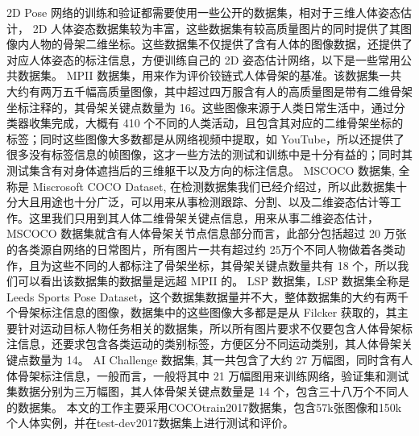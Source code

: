 2D Pose 网络的训练和验证都需要使用一些公开的数据集，相对于三维人体姿态估计， 2D 人体姿态数据集较为丰富，这些数据集有较高质量图片的同时提供了其图像内人物的骨架二维坐标。这些数据集不仅提供了含有人体的图像数据，还提供了对应人体姿态的标注信息，方便训练自己的 2D 姿态估计网络，以下是一些常用公共数据集。
MPII 数据集，用来作为评价铰链式人体骨架的基准。该数据集一共大约有两万五千幅高质量图像，其中超过四万服含有人的高质量图是带有二维骨架坐标注释的，其骨架关键点数量为 16。这些图像来源于人类日常生活中，通过分类器收集完成，大概有 410 个不同的人类活动，且包含其对应的二维骨架坐标的标签；同时这些图像大多数都是从网络视频中提取，如 YouTube，所以还提供了很多没有标签信息的帧图像，这才一些方法的测试和训练中是十分有益的；同时其测试集含有对身体遮挡后的三维躯干以及方向的标注信息。
MSCOCO 数据集, 全称是 Miscrosoft COCO Dataset, 在检测数据集我们已经介绍过，所以此数据集十分大且用途也十分广泛，可以用来从事检测跟踪、分割、以及二维姿态估计等工作。这里我们只用到其人体二维骨架关键点信息，用来从事二维姿态估计，MSCOCO 数据集就含有人体骨架关节点信息部分而言，此部分包括超过 20 万张的各类源自网络的日常图片，所有图片一共有超过约 25万个不同人物做着各类动作，且为这些不同的人都标注了骨架坐标，其骨架关键点数量共有 18 个，所以我们可以看出该数据集的数据量是远超 MPII 的。
LSP 数据集，LSP 数据集全称是 Leeds Sports Pose Dataset，这个数据集数据量并不大，整体数据集的大约有两千个骨架标注信息的图像，数据集中的这些图像大多都是是从 Filcker 获取的，其主要针对运动目标人物任务相关的数据集，所以所有图片要求不仅要包含人体骨架标注信息，还要求包含各类运动的类别标签，方便区分不同运动类别，其人体骨架关键点数量为 14。
AI Challenge 数据集, 其一共包含了大约 27 万幅图，同时含有人体骨架标注信息，一般而言，一般将其中 21 万幅图用来训练网络，验证集和测试集数据分别为三万幅图，其人体骨架关键点数量是 14 个，包含三十八万个不同人的数据集。
本文的工作主要采用COCOtrain2017数据集，包含57k张图像和150k个人体实例，并在test-dev2017数据集上进行测试和评价。

